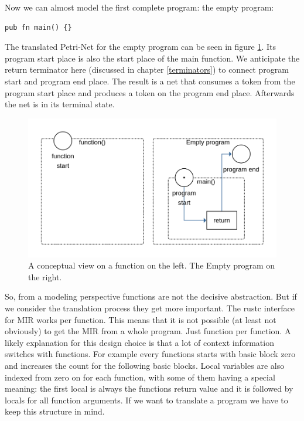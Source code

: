 Now we can almost model the first complete program: the empty program:
\begin{lstlisting}
pub fn main() {}
\end{lstlisting}
The translated Petri-Net for the empty program can be seen in figure \ref{basic_program}.
Its program start place is also the start place of the main function.
We anticipate the return terminator here (discussed in chapter \ref{terminators}) to connect program start and program end place.
The result is a net that consumes a token from the program start place and produces a token on the program end place.
Afterwards the net is in its terminal state.

\begin{figure}
    \centering
    \includegraphics[width=.7\textwidth]{../diagrams/function_and_empty_program.png}
    \caption{
        A conceptual view on a function on the left. The Empty program on the right.
    }
    \label{basic_program}
\end{figure}

So, from a modeling perspective functions are not the decisive abstraction.
But if we consider the translation process they get more important.
The rustc interface for MIR works per function.
This means that it is not possible (at least not obviously) to get the MIR from a whole program.
Just function per function.
A likely explanation for this design choice is that a lot of context information switches with functions.
For example every functions starts with basic block zero and increases the count for the following basic blocks.
Local variables are also indexed from zero on for each function, with some of them having a special meaning:
the first local is always the functions return value and it is followed by locals for all function arguments.
If we want to translate a program we have to keep this structure in mind.

